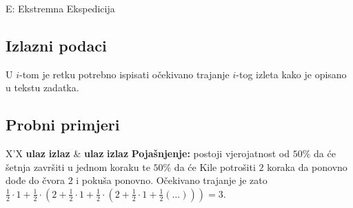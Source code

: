 \begin{statement}[
  timelimit=2.5 s,
  memorylimit=512 MiB,
]{E: Ekstremna Ekspedicija}
\subsection*{Izlazni podaci}
U $i$-tom je retku potrebno ispisati očekivano trajanje $i$-tog izleta kako
je opisano u tekstu zadatka.

\subsection*{Probni primjeri}
\begin{tabularx}{\textwidth}{X'X}
  \textbf{ulaz}
  \linespread{1}{}
  \textbf{izlaz}
  \linespread{1}{} &
  \textbf{ulaz}
  \linespread{1}{}
  \textbf{izlaz}
  \linespread{1}{}
  \textbf{Pojašnjenje:}
  postoji vjerojatnost od $50\%$ da će šetnja završiti u jednom koraku te $50\%$
  da će Kile potrošiti $2$ koraka da ponovno dođe do čvora $2$ i pokuša ponovno.
  Očekivano trajanje je zato $\frac{1}{2} \cdot 1 + \frac{1}{2} \cdot (2 +
  \frac{1}{2} \cdot 1 + \frac{1}{2} \cdot (2 + \frac{1}{2} \cdot 1 +
  \frac{1}{2}(\ldots))) = 3$.
\end{tabularx}


\end{statement}

